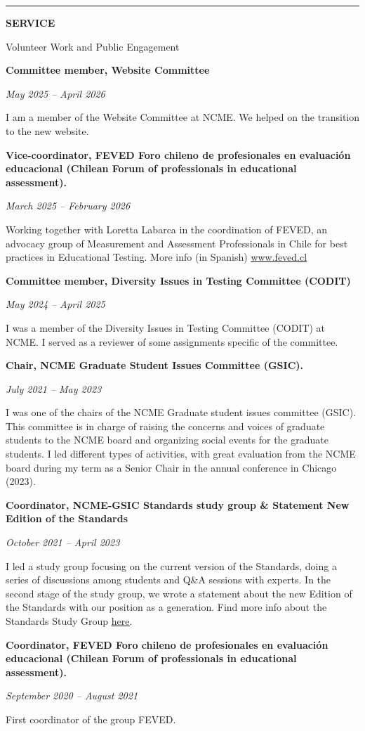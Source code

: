 \documentclass[10.5pt]{article}
\newcommand{\link}[2]{\href{#1}{\color{cvaccent}\uline{#2}}}
\newcommand{\cvsection}[2]{%
  \Needspace{5\baselineskip}\par\vspace{20pt}%
  {\color{cvaccent}\rule{40pt}{3pt}}\par\vspace{7pt}
  {\fontsize{8.3}{10}\selectfont\bfseries\color{cvaccent} \MakeUppercase{#1}}\par\vspace{3pt}
  {\playfairsb\fontsize{20}{24}\selectfont\color{cvink} #2}\par\vspace{9pt}%
}
\newcommand{\jobentry}[4]{%
  \par\noindent\raggedright{\bfseries\color{cvink} #1}\par
  {\itshape\color{cvmuted} #2}\par
  {\color{cvink}#3}\par\vspace{9pt}%
}
\begin{document}
\newpage
\cvsection{Service}{Volunteer Work and Public Engagement}
\jobentry{Committee member, Website Committee}{May 2025 -- April 2026}{I am a member of the Website Committee at NCME. We helped on the transition to the new website.}{ncme.png}
\jobentry{Vice-coordinator, FEVED Foro chileno de profesionales en evaluaci\'on educacional (Chilean Forum of professionals in educational assessment).}{March 2025 -- February 2026}{Working together with Loretta Labarca in the coordination of FEVED, an advocacy group of Measurement and Assessment Professionals in Chile for best practices in Educational Testing. More info (in Spanish) \link{http://www.feved.cl/}{www.feved.cl}}{feved.png}
\jobentry{Committee member, Diversity Issues in Testing Committee (CODIT)}{May 2024 -- April 2025}{I was a member of the Diversity Issues in Testing Committee (CODIT) at NCME. I served as a reviewer of some assignments specific of the committee.}{ncme.png}
\jobentry{Chair, NCME Graduate Student Issues Committee (GSIC).}{July 2021 -- May 2023}{I was one of the chairs of the NCME Graduate student issues committee (GSIC). This committee is in charge of raising the concerns and voices of graduate students to the NCME board and organizing social events for the graduate students. I led different types of activities, with great evaluation from the NCME board during my term as a Senior Chair in the annual conference in Chicago (2023).}{ncme.png}
\jobentry{Coordinator, NCME-GSIC Standards study group \& Statement New Edition of the Standards}{October 2021 -- April 2023}{I led a study group focusing on the current version of the Standards, doing a series of discussions among students and Q\&A sessions with experts. In the second stage of the study group, we wrote a statement about the new Edition of the Standards with our position as a generation. Find more info about the Standards Study Group \link{https://www.ncme.org/students/student-programs/standards-study-group}{here}.}{ncme.png}
\jobentry{Coordinator, FEVED Foro chileno de profesionales en evaluaci\'on educacional (Chilean Forum of professionals in educational assessment).}{September 2020 -- August 2021}{First coordinator of the group FEVED.}{feved.png}
\end{document}
